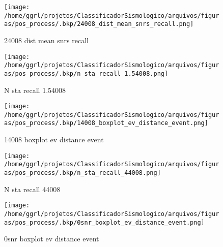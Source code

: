                     \begin{figure}[H]
                        \centering
                        \texttt{[image: /home/ggrl/projetos/ClassificadorSismologico/arquivos/figuras/pos\_process/.bkp/24008\_dist\_mean\_snrs\_recall.png]}
                        \caption{24008 dist mean snrs recall}
                        \label{fig:24008_dist_mean_snrs_recall}
                    \end{figure}
                

                    \begin{figure}[H]
                        \centering
                        \texttt{[image: /home/ggrl/projetos/ClassificadorSismologico/arquivos/figuras/pos\_process/.bkp/n\_sta\_recall\_1.54008.png]}
                        \caption{N sta recall 1.54008}
                        \label{fig:n_sta_recall_1.54008}
                    \end{figure}
                

                    \begin{figure}[H]
                        \centering
                        \texttt{[image: /home/ggrl/projetos/ClassificadorSismologico/arquivos/figuras/pos\_process/.bkp/14008\_boxplot\_ev\_distance\_event.png]}
                        \caption{14008 boxplot ev distance event}
                        \label{fig:14008_boxplot_ev_distance_event}
                    \end{figure}
                

                    \begin{figure}[H]
                        \centering
                        \texttt{[image: /home/ggrl/projetos/ClassificadorSismologico/arquivos/figuras/pos\_process/.bkp/n\_sta\_recall\_44008.png]}
                        \caption{N sta recall 44008}
                        \label{fig:n_sta_recall_44008}
                    \end{figure}
                

                    \begin{figure}[H]
                        \centering
                        \texttt{[image: /home/ggrl/projetos/ClassificadorSismologico/arquivos/figuras/pos\_process/.bkp/0snr\_boxplot\_ev\_distance\_event.png]}
                        \caption{0snr boxplot ev distance event}
                        \label{fig:0snr_boxplot_ev_distance_event}
                    \end{figure}
                


